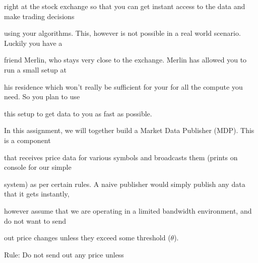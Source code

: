 \documentclass[a4paper,portrait,12pt]{article}
\begin{document}
\begin{flushleft}
right at the stock exchange so that you can get instant access to the data and make trading decisions
\end{flushleft}


\begin{flushleft}
using your algorithms. This, however is not possible in a real world scenario. Luckily you have a
\end{flushleft}


\begin{flushleft}
friend Merlin, who stays very close to the exchange. Merlin has allowed you to run a small setup at
\end{flushleft}


\begin{flushleft}
his residence which won't really be sufficient for your for all the compute you need. So you plan to use
\end{flushleft}


\begin{flushleft}
this setup to get data to you as fast as possible.
\end{flushleft}


\begin{flushleft}
In this assignment, we will together build a Market Data Publisher (MDP). This is a component
\end{flushleft}


\begin{flushleft}
that receives price data for various symbols and broadcasts them (prints on console for our simple
\end{flushleft}


\begin{flushleft}
system) as per certain rules. A naive publisher would simply publish any data that it gets instantly,
\end{flushleft}


\begin{flushleft}
however assume that we are operating in a limited bandwidth environment, and do not want to send
\end{flushleft}


\begin{flushleft}
out price changes unless they exceed some threshold ($\theta$).
\end{flushleft}


\begin{flushleft}
Rule: Do not send out any price unless
\end{flushleft}
\end{document}
